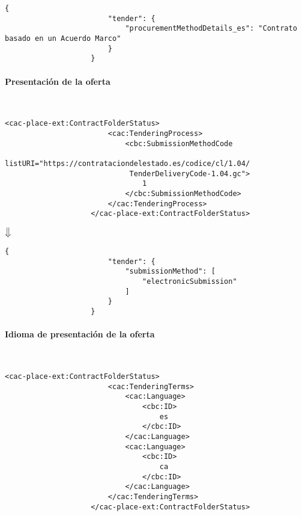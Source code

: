                 \begin{lstlisting}[language=lJSON]
                    {
                        "tender": {
                            "procurementMethodDetails_es": "Contrato basado en un Acuerdo Marco"
                        }
                    }
                \end{lstlisting}
\newpage
            \paragraph{Presentación de la oferta} \mbox{}\\
                \begin{lstlisting}[language=lXML]
                    <cac-place-ext:ContractFolderStatus>
                        <cac:TenderingProcess>
                            <cbc:SubmissionMethodCode
                             listURI="https://contrataciondelestado.es/codice/cl/1.04/
                             TenderDeliveryCode-1.04.gc">
                                1
                            </cbc:SubmissionMethodCode>
                        </cac:TenderingProcess>
                    </cac-place-ext:ContractFolderStatus>
                \end{lstlisting}
                
                \begin{center}
                    $\big\Downarrow$
                \end{center}
                
                \begin{lstlisting}[language=lJSON]
                    {
                        "tender": {
                            "submissionMethod": [
                                "electronicSubmission"
                            ]
                        }
                    }
                \end{lstlisting}
                
            \paragraph{Idioma de presentación de la oferta} \mbox{}\\
                \begin{lstlisting}[language=lXML]
                    <cac-place-ext:ContractFolderStatus>
                        <cac:TenderingTerms>
                            <cac:Language>
                                <cbc:ID>
                                    es
                                </cbc:ID>
                            </cac:Language>
                            <cac:Language>
                                <cbc:ID>
                                    ca
                                </cbc:ID>
                            </cac:Language>
                        </cac:TenderingTerms>
                    </cac-place-ext:ContractFolderStatus>
                \end{lstlisting}
                
